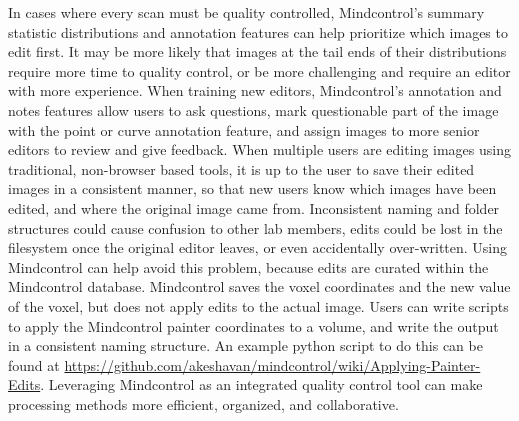 In cases where every scan must be quality controlled, Mindcontrol's summary statistic distributions and annotation features can help prioritize which images to edit first. It may be more likely that images at the tail ends of their distributions require more time to quality control, or be more challenging and require an editor with more experience. When training new editors, Mindcontrol's annotation and notes features allow users to ask questions, mark questionable part of the image with the point or curve annotation feature, and assign images to more senior editors to review and give feedback. When multiple users are editing images using traditional, non-browser based tools, it is up to the user to save their edited images in a consistent manner, so that new users know which images have been edited, and where the original image came from. Inconsistent naming and folder structures could cause confusion to other lab members, edits could be lost in the filesystem once the original editor leaves, or even accidentally over-written. Using Mindcontrol can help avoid this problem, because edits are curated within the Mindcontrol database. Mindcontrol saves the voxel coordinates and the new value of the voxel, but does not apply edits to the actual image. Users can write scripts to apply the Mindcontrol painter coordinates to a volume, and write the output in a consistent naming structure. An example python script to do this can be found at \href{http://}{https://github.com/akeshavan/mindcontrol/wiki/Applying-Painter-Edits}. Leveraging Mindcontrol as an integrated quality control tool can make processing methods more efficient, organized, and collaborative.



